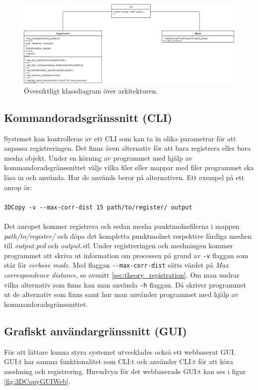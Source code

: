 \begin{figure}[H]
	\centering
	\includegraphics[width=130mm]{figures/klassdiagram.png}
	\caption{Översiktligt klassdiagram över arkitekturen.}
	\label{fig:class_diagram}
\end{figure}

\subsection{Kommandoradsgränssnitt (CLI)}

Systemet kan kontrolleras av ett CLI som kan ta in olika parametrar för att anpassa registreringen. Det finns även alternativ för att bara registrera eller bara mesha objekt. Under en körning av programmet med hjälp av kommandoradsgränssnittet väljs vilka filer eller mappar med filer programmet ska läsa in och använda. Hur de används beror på alternativen. Ett exempel på ett anrop är:\\\\
\texttt{3DCopy -v -{}-max-corr-dist 15 path/to/register/ output}\\\\
Det anropet kommer registrera och sedan mesha punktmolnsfilerna i mappen \textit{path/to/register/} och döpa det kompletta punktmolnet respektive färdiga meshen till \textit{output.pcd} och \textit{output.stl}. Under registreringen och meshningen kommer programmet att skriva ut information om processen på grund av \texttt{-v} flaggan som står för \textit{verbose mode}. Med flaggan \texttt{-{}-max-corr-dist} sätts värdet på \textit{Max correspondence distance}, se avsnitt \ref{sec:theory_registration}. Om man undrar vilka alternativ som finns kan man använda \texttt{-h} flaggan. Då skriver programmet ut de alternativ som finns samt hur man använder programmet med hjälp av kommandoradsgränssnittet. 

\subsection{Grafiskt användargränssnitt (GUI)}
För att lättare kunna styra systemet utvecklades också ett webbaserat GUI. GUI:t har samma funktionalitet som CLI:t och använder CLI:t för att köra meshning och registrering. Huvudvyn för det webbaserade GUI:t kan ses i figur \ref{fig:3DCopyGUIWeb}. 

